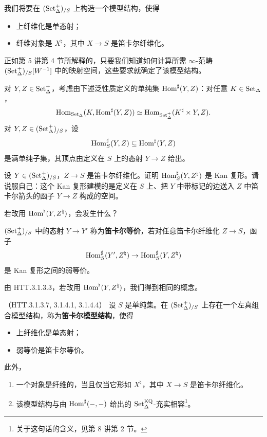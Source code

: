 \nitem\label{L20-2.12} 我们将要在 $(\operatorname{Set}^+_\Delta)_{/S}$ 上构造一个模型结构，使得
\begin{itemize}[leftmargin=2.2em,itemsep=0.1em]
\item 上纤维化是单态射；
\item 纤维对象是 $X^{\natural}$，其中 $X\to S$ 是笛卡尔纤维化。
\end{itemize}
正如第 5 讲第 4 节所解释的，只要我们知道如何计算所需 $\infty$-范畴 $(\operatorname{Set}^+_\Delta)_{/S}[W^{-1}]$ 中的映射空间，这些要求就确定了该模型结构。

\begin{construction}\label{L20-2.13}
对 $Y,Z\in\operatorname{Set}^+_\Delta$，考虑由下述泛性质定义的单纯集 $\operatorname{Hom}^{\sharp}(Y,Z)$：对任意 $K\in\operatorname{Set}_\Delta$，
\[
\operatorname{Hom}_{\operatorname{Set}_\Delta}(K,\operatorname{Hom}^{\sharp}(Y,Z))\simeq\operatorname{Hom}_{\operatorname{Set}^+_\Delta}(K^{\sharp}\times Y,Z).
\]
对 $Y,Z\in(\operatorname{Set}^+_\Delta)_{/S}$，设
\[
\operatorname{Hom}^{\sharp}_S(Y,Z)\subseteq\operatorname{Hom}^{\sharp}(Y,Z)
\]
是满单纯子集，其顶点由定义在 $S$ 上的态射 $Y\to Z$ 给出。
\end{construction}

\begin{exercise}\label{L20-2.14}
设 $Y\in(\operatorname{Set}^+_\Delta)_{/S}$，$Z\to S$ 是笛卡尔纤维化。证明 $\operatorname{Hom}^{\sharp}_S(Y,Z^{\natural})$ 是 Kan 复形。请说服自己：这个 Kan 复形建模的是定义在 $S$ 上、把 $Y$ 中带标记的边送入 $Z$ 中笛卡尔箭头的函子 $Y\to Z$ 构成的空间。
\end{exercise}

\begin{exercise}\label{L20-2.15}
若改用 $\operatorname{Hom}^{\flat}(Y,Z^{\natural})$，会发生什么？
\end{exercise}

\begin{definition}\label{L20-2.16}
$(\operatorname{Set}^+_\Delta)_{/S}$ 中的态射 $Y\to Y'$ 称为\textbf{笛卡尔等价}，若对任意笛卡尔纤维化 $Z\to S$，函子
\[
\operatorname{Hom}^{\sharp}_S(Y',Z^{\natural})\to\operatorname{Hom}^{\sharp}_S(Y,Z^{\natural})
\]
是 Kan 复形之间的弱等价。
\end{definition}

\begin{remark}\label{L20-2.17}
由 HTT.3.1.3.3，若改用 $\operatorname{Hom}^{\flat}(Y,Z^{\natural})$，我们得到相同的概念。
\end{remark}

\begin{theorem}\label{L20-2.18}（HTT.3.1.3.7, 3.1.4.1, 3.1.4.4）
设 $S$ 是单纯集。在 $(\operatorname{Set}^+_\Delta)_{/S}$ 上存在一个左真组合模型结构，称为\textbf{笛卡尔模型结构}，使得
\begin{itemize}[leftmargin=2.2em,itemsep=0.1em]
\item[(C)] 上纤维化是单态射；
\item[(W)] 弱等价是笛卡尔等价。
\end{itemize}
此外，
\begin{enumerate}[label=(\arabic*),leftmargin=2.4em,itemsep=0.1em]
\item 一个对象是纤维的，当且仅当它形如 $X^{\natural}$，其中 $X\to S$ 是笛卡尔纤维化。
\item 该模型结构与由 $\operatorname{Hom}^{\sharp}(-,-)$ 给出的 $\operatorname{Set}^{\mathrm{KQ}}_\Delta$-充实相容\footnote{关于这句话的含义，见第 8 讲第 2 节。}。
\end{enumerate}
\end{theorem}


